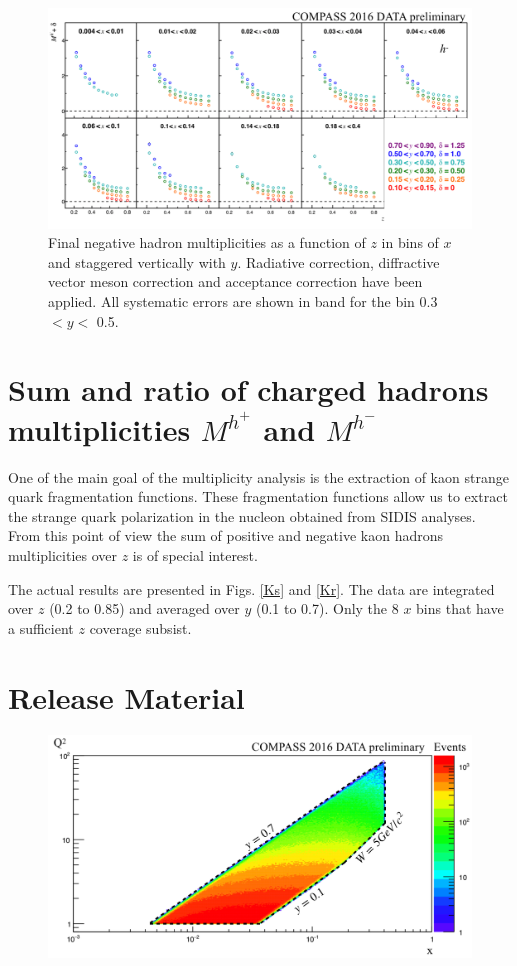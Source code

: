 \documentclass[letterpaper,12pt]{article}
\begin{document}
\begin{figure}
	\includegraphics[scale=0.5]{./gfx/hm.png}
	\caption{Final negative hadron multiplicities as a function of $z$ in bins of $x$ and staggered vertically with $y$. Radiative correction, diffractive vector meson correction and acceptance correction have been applied. All systematic errors are shown in band for the bin 0.3 $< y <$ 0.5.}
	\label{hm}
\end{figure}

\newpage

\section{Sum and ratio of charged hadrons multiplicities $M^{h^+}$ and $M^{h^-}$} \label{MSR}

One of the main goal of the multiplicity analysis is the extraction of kaon strange quark fragmentation functions. These fragmentation functions allow us to extract the strange quark polarization in the nucleon obtained from SIDIS analyses. From this point of view the sum of positive and negative kaon hadrons multiplicities over $z$ is of special interest.

The actual results are presented in Figs. \ref{Ks} and \ref{Kr}. The data are integrated over $z$ (0.2 to 0.85) and averaged over $y$ (0.1 to 0.7). Only the 8 $x$ bins that have a sufficient $z$ coverage subsist.

\newpage

\section{Release Material} \label{RM}

\begin{figure}[H]
	\includegraphics[scale=0.4]{./gfx/xQ2.png}
	\caption{}
	\label{xQ2}
\end{figure}
\end{document}
